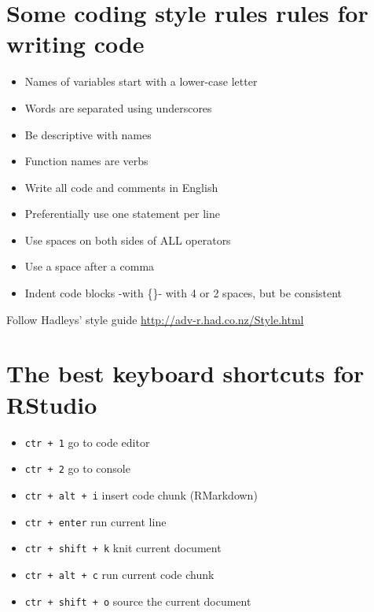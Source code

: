 \documentclass[]{book}
\providecommand{\tightlist}{%
  \setlength{\itemsep}{0pt}\setlength{\parskip}{0pt}}
\begin{document}
\hypertarget{some-coding-style-rules-rules-for-writing-code}{%
\section{Some coding style rules rules for writing code}\label{some-coding-style-rules-rules-for-writing-code}}

\begin{itemize}
\tightlist
\item
  Names of variables start with a lower-case letter
\item
  Words are separated using underscores
\item
  Be descriptive with names
\item
  Function names are verbs
\item
  Write all code and comments in English
\item
  Preferentially use one statement per line
\item
  Use spaces on both sides of ALL operators
\item
  Use a space after a comma
\item
  Indent code blocks -with \{\}- with 4 or 2 spaces, but be consistent
\end{itemize}

Follow Hadleys' style guide \url{http://adv-r.had.co.nz/Style.html}

\hypertarget{the-best-keyboard-shortcuts-for-rstudio}{%
\section{The best keyboard shortcuts for RStudio}\label{the-best-keyboard-shortcuts-for-rstudio}}

\begin{itemize}
\tightlist
\item
  \texttt{ctr\ +\ 1} go to code editor
\item
  \texttt{ctr\ +\ 2} go to console
\item
  \texttt{ctr\ +\ alt\ +\ i} insert code chunk (RMarkdown)
\item
  \texttt{ctr\ +\ enter} run current line
\item
  \texttt{ctr\ +\ shift\ +\ k} knit current document
\item
  \texttt{ctr\ +\ alt\ +\ c} run current code chunk
\item
  \texttt{ctr\ +\ shift\ +\ o} source the current document
\end{itemize}
\end{document}
